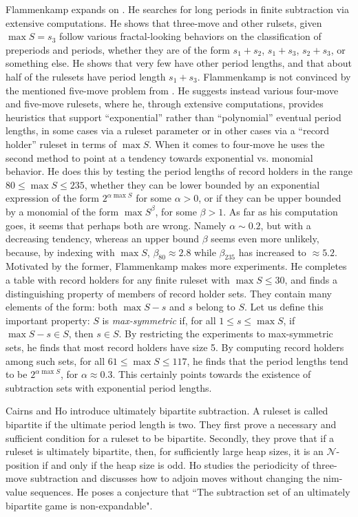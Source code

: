 \documentclass{amsart}
\theoremstyle{plain}
\theoremstyle{definition}
\newcommand{\N}{\ensuremath{\mathcal N}}
\renewcommand{\le}{\leqslant}
\begin{document}
Flammenkamp \cite{Flammenkamp_1997} expands on \cite{althofer1995superlinear}. He searches for long periods in {\sc finite subtraction} via extensive computations.  He shows that {\sc three-move} and other rulsets, given $\max S=s_3$ follow various fractal-looking behaviors on the classification of preperiods and periods, whether they are of the form $s_1+s_2$, $s_1+s_3$, $s_2+s_3$, or something else. He shows that very few have other period lengths, and that about half of the rulesets have period length $s_1+s_3$. Flammenkamp is not convinced by the mentioned {\sc five-move} problem from  \cite{althofer1995superlinear}. He suggests instead various {\sc four-move} and {\sc five-move} rulesets, where he, through extensive computations, provides heuristics that support ``exponential'' rather than ``polynomial'' eventual period lengths, in some cases via a ruleset parameter or in other cases via a ``record holder'' ruleset in terms of $\max S$. When it comes to {\sc four-move} he uses the second method to point at a tendency towards exponential vs. monomial behavior. He does this by testing the period lengths of record holders in the range $80\le \max S\le 235$, whether they can be lower bounded by an exponential expression of the form $2^{\alpha\max{S}}$ for some $ \alpha > 0$, or if they can be upper bounded by a monomial of the form $\max S^\beta$, for some $\beta>1$. As far as his computation goes, it seems that perhaps both are wrong.  Namely $\alpha\sim 0.2$, but with a decreasing tendency, whereas an upper bound $\beta$ seems even more unlikely, because, by indexing with $\max S$,  $\beta_{80}\approx 2.8$ while $\beta_{235}$ has increased to $\approx 5.2$. Motivated by the former, Flammenkamp makes more experiments. He completes a table with record holders for any finite ruleset with $\max S\le 30$, and finds a distinguishing property of members of record holder sets. They contain many elements of the form: both $\max S-s$ and $s$ belong to $S$.  Let us define this important property: $S$ is {\em max-symmetric} if, for all $1\le s\le \max S$, if $\max S-s \in S$, then $s\in S$. By restricting the experiments to max-symmetric sets, he finds that most record holders have size 5. By computing record holders among such sets, for all $61 \le \max S\le 117$, he finds that the period lengths tend to be $2^{\alpha\max S}$, for $\alpha\approx 0.3$. This certainly points towards the existence of subtraction sets with exponential period lengths.


Cairns and Ho \cite{cairns2010ultimately} introduce {\sc ultimately bipartite subtraction}. A ruleset is called bipartite if the ultimate period length is two. They first prove a necessary and sufficient condition for a ruleset to be bipartite. Secondly, they prove that if a ruleset is ultimately bipartite, then, for sufficiently large heap sizes, it is an \N-position if and only if the heap size is odd.  Ho  \cite{ho2015expansion} studies the periodicity of {\sc three-move subtraction} and discusses how to adjoin moves without changing the nim-value sequences.  
He poses a conjecture that ``The subtraction set of an ultimately bipartite game is non-expandable".
\end{document}
